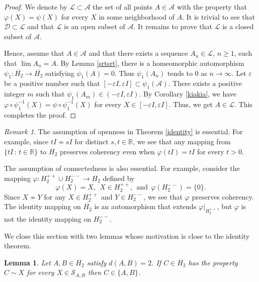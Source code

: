 \documentclass[10pt]{amsart}
\newtheorem{lemma}[theorem]{Lemma}
\theoremstyle{definition}
\theoremstyle{remark}
\newtheorem{remark}[theorem]{Remark}
\numberwithin{subsection}{section}
\numberwithin{equation}{section}
\newcommand\oH{{\overline{H_2}}}
\begin{document}
\begin{proof}
We denote by $\mathcal{L} \subset \mathcal{A}$ the set of all points $A \in \mathcal{A}$ with the property that 
$\varphi (X) = \psi(X)$ for every $X$ in some neighborhood of $A$. It is trivial to see that $\mathcal{D}\subset \mathcal{L}$ and that $\mathcal{L}$ is an open subset of $\mathcal{A}$.
It remains to prove that $\mathcal{L}$ is a closed subset of $\mathcal{A}$. 

Hence, assume that $A \in \mathcal{A}$ and that there exists a sequence $A_n \in \mathcal{L}$, $n\geq 1$, such that $\lim A_n = A$. 
By Lemma \ref{srtsrt}, there is a homeomorphic automorphism $\psi_1\colon \oH\to\oH$ satisfying $\psi_1(A)=0$. 
Thus $\psi_1(A_n)$ tends to $0$ as $n\to\infty$. 
Let $\varepsilon$ be a positive number such that $[- \varepsilon I, \varepsilon I] \subset \psi_1(\mathcal{A})$. There exists a positive integer $m$ such that $\psi_1(A_m) \in 
(- \varepsilon I, \varepsilon I)$. 
By Corollary \ref{kiakia}, we have 
 $\varphi\circ \psi_1^{-1} (X) = \psi\circ \psi_1^{-1}(X)$ for every $X \in [- \varepsilon I, \varepsilon I]$. Thus, we get $A\in \mathcal{L}$. 
This completes the proof.
\end{proof}

\begin{remark}
The assumption of openness in Theorem \ref{identity} is essential. 
For example, since $tI\not\sim sI$ for distinct $s,t\in \mathbb{R}$, we see that any mapping from  $\{tI\,:\, t\in \mathbb{R}\}$ to $\oH$ preserves coherency even when $\varphi(tI)=tI$ for every $t>0$.

The assumption of connectedness is also essential. 
For example, consider the mapping $\varphi\colon H_2^{++}\cup H_2^{--}\to H_2$ defined by 
\[
\varphi(X)=X, \ \ X\in H_2^{++},\ \ \text{and}\ \ \varphi(H_2^{--})=\{0\}. 
\]
Since $X\not\sim Y$ for any $X\in H_2^{++}$ and $Y\in H_2^{--}$, we see that $\varphi$ preserves coherency.
The identity mapping on $\oH$ is an automorphism that extends $\varphi|_{H_2^{++}}$, but $\varphi$ is not the identity mapping on $H_2^{--}$.   
\end{remark}

We close this section with two lemmas whose motivation is close to the identity theorem. 

\begin{lemma}\label{sss}
Let $A, B\in \oH$ satisfy $d(A, B)=2$. 
If $C\in \oH$ has the property $C\sim X$ for every $X\in \mathcal{S}_{A, B}$ then $C\in \{A, B\}$.
\end{lemma}
\end{document}
